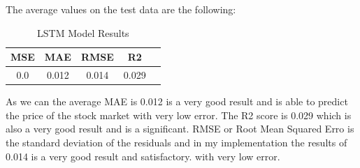 \documentclass{imc-inf}
\begin{document}
			The average values on the test data are the following: 
			\begin{table}[h!]
					\centering
					\begin{tabular}{|c|c|c|c|c|}
						\hline
						\textbf{MSE} & \textbf{MAE} & \textbf{RMSE}  & \textbf{R2}\\ \hline
						0.0 & 0.012 & 0.014 & 0.029\\ \hline
					
		
					\end{tabular}
					\caption{LSTM Model Results}
					\label{tab:lstm_model_results}
	
			\end{table}


				
			As we can the average MAE is 0.012 is a very good result and is able to predict the price of the stock market with very low error. The R2 score is 0.029 which is also a very good result and is a significant.
			RMSE or Root Mean Squared Erro is the standard deviation of the residuals and in my implementation the results of  0.014 is a very good result and satisfactory.
			with very low error.
\end{document}
